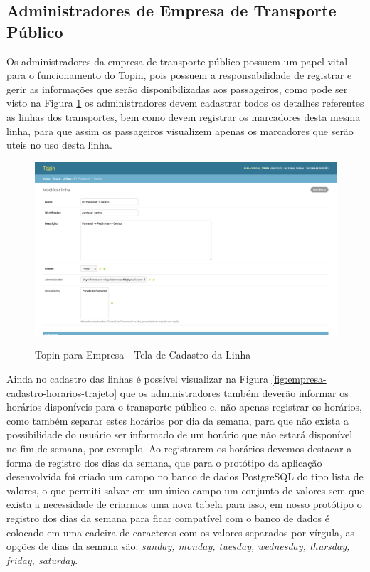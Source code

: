 {{{{{{{\subsection{Administradores de Empresa de Transporte Público}

Os administradores da empresa de transporte público possuem um papel vital para o funcionamento do Topin, pois possuem a responsabilidade de registrar e gerir as informações que serão disponibilizadas aos passageiros, como pode ser visto na Figura \ref{fig:empresa-cadastro-linha} os administradores devem cadastrar todos os detalhes referentes as linhas dos transportes, bem como devem registrar os marcadores desta mesma linha, para que assim os passageiros visualizem apenas os marcadores que serão uteis no uso desta linha.

\begin{figure}[t]
\caption{Topin para Empresa - Tela de Cadastro da Linha}
\centering
\includegraphics[width=1.0\textwidth]{imagens/cadastro-linha.png}
\label{fig:empresa-cadastro-linha}
\end{figure}

Ainda no cadastro das linhas é possível visualizar na Figura \ref{fig:empresa-cadastro-horarios-trajeto} que os administradores também deverão informar os horários disponíveis para o transporte público e, não apenas registrar os horários, como também separar estes horários por dia da semana, para que não exista a possibilidade do usuário ser informado de um horário que não estará disponível no fim de semana, por exemplo.  Ao registrarem os horários devemos destacar a forma de registro dos dias da semana, que para o protótipo da aplicação desenvolvida foi criado um campo no banco de dados PostgreSQL do tipo lista de valores, o que permiti salvar em um único campo um conjunto de valores sem que exista a necessidade de criarmos uma nova tabela para isso, em nosso protótipo o registro dos dias da semana para ficar compatível com o banco de dados é colocado em uma cadeira de caracteres com os valores separados por vírgula, as opções de dias da semana são: \textit{sunday, monday, tuesday, wednesday, thursday, friday, saturday}.

}}}}}}}
